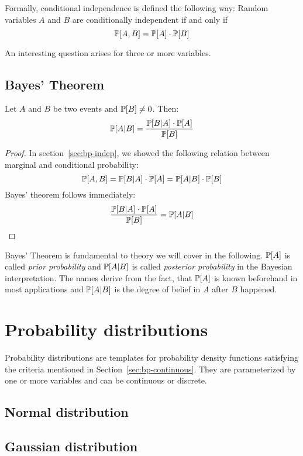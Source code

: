 Formally, conditional independence is defined the following way: Random variables $A$ and $B$ are conditionally independent if and only if
\[ \mathbb P[A, B] = \mathbb P[A] \cdot \mathbb P[B] \]

An interesting question arises for three or more variables.


\subsection{Bayes' Theorem}
\label{sec:bp-bayes}
%
\begin{theorem}
  Let $A$ and $B$ be two events and $\mathbb P[B] \neq 0$. Then:
  \[ \mathbb P[A|B] = \frac{\mathbb P[B|A] \cdot \mathbb P[A]}{\mathbb P[B]} \]
\end{theorem}
\begin{proof}
  In section~\ref{sec:bp-indep}, we showed the following relation between marginal and conditional probability:
  \[ \mathbb P[A,B] = \mathbb P[B|A] \cdot \mathbb P[A] = \mathbb P[A|B] \cdot \mathbb P[B] \]
  Bayes' theorem follows immediately:
  \[ \frac{\mathbb P[B|A] \cdot \mathbb P[A]}{\mathbb P[B]} = \mathbb P[A|B] \]
\end{proof}

Bayes' Theorem is fundamental to theory we will cover in the following.
$\mathbb P[A]$ is called \emph{prior probability} and $\mathbb P[A|B]$ is called \emph{posterior probability} in the Bayesian interpretation.
The names derive from the fact, that $\mathbb P[A]$ is known beforehand in most applications and $\mathbb P[A|B]$ is the degree of belief in $A$ after $B$ happened.

\section{Probability distributions}
\label{sec:bp-dist}
%
Probability distributions are templates for probability density functions
satisfying the criteria mentioned in Section~\ref{sec:bp-continuous}.
They are parameterized by one or more variables and can be continuous or discrete.

\subsection{Normal distribution}
\label{sec:bp-norm-dist}
%

\subsection{Gaussian distribution}
\label{sec:bp-gaussian-dist}
%

